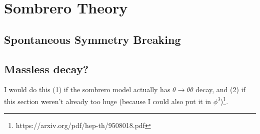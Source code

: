 \chapter{Sombrero Theory}

\section{Spontaneous Symmetry Breaking}

\section{Massless decay?}

I would do this (1) if the sombrero model actually has $\theta\rightarrow \theta\theta$ decay, and (2) if this section weren't already too huge (because I could also put it in $\phi^3$)\footnote{https://arxiv.org/pdf/hep-th/9508018.pdf}.